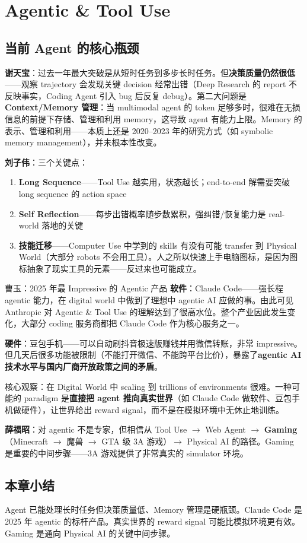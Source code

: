 \section{Agentic \& Tool Use}

\subsection{当前 Agent 的核心瓶颈}

\textbf{谢天宝}：过去一年最大突破是从短时任务到多步长时任务。但\textbf{决策质量仍然很低}——观察 trajectory 会发现关键 decision 经常出错（Deep Research 的 report 不反映事实，Coding Agent 引入 bug 后反复 debug）。第二大问题是 \textbf{Context/Memory 管理}：当 multimodal agent 的 token 足够多时，很难在无损信息的前提下存储、管理和利用 memory，这导致 agent 有能力上限。Memory 的表示、管理和利用——本质上还是 2020--2023 年的研究方式（如 symbolic memory management），并未根本性改变。

\textbf{刘子伟}：三个关键点：
\begin{enumerate}
  \item \textbf{Long Sequence}——Tool Use 越实用，状态越长；end-to-end 解需要突破 long sequence 的 action space
  \item \textbf{Self Reflection}——每步出错概率随步数累积，强纠错/恢复能力是 real-world 落地的关键
  \item \textbf{技能迁移}——Computer Use 中学到的 skills 有没有可能 transfer 到 Physical World（大部分 robots 不会用工具）。人之所以快速上手电脑图标，是因为图标抽象了现实工具的元素——反过来也可能成立。
\end{enumerate}

\begin{importantbox}{曹玉：2025 年最 Impressive 的 Agentic 产品}
\textbf{软件}：Claude Code——强长程 agentic 能力，在 digital world 中做到了理想中 agentic AI 应做的事。由此可见 Anthropic 对 Agentic \& Tool Use 的理解达到了很高水位。整个产业因此发生变化，大部分 coding 服务商都把 Claude Code 作为核心服务之一。

\textbf{硬件}：豆包手机——可以自动刷抖音极速版赚钱并用微信转账，非常 impressive。但几天后很多功能被限制（不能打开微信、不能跨平台比价），暴露了\textbf{agentic AI 技术水平与国内厂商开放政策之间的矛盾}。

核心观察：在 Digital World 中 scaling 到 trillions of environments 很难。一种可能的 paradigm 是\textbf{直接把 agent 推向真实世界}（如 Claude Code 做软件、豆包手机做硬件），让世界给出 reward signal，而不是在模拟环境中无休止地训练。
\end{importantbox}

\textbf{薛福昭}：对 agentic 不是专家，但相信从 Tool Use $\to$ Web Agent $\to$ \textbf{Gaming}（Minecraft $\to$ 魔兽 $\to$ GTA 级 3A 游戏）$\to$ Physical AI 的路径。Gaming 是重要的中间步骤——3A 游戏提供了非常真实的 simulator 环境。

\subsection{本章小结}
Agent 已能处理长时任务但决策质量低、Memory 管理是硬瓶颈。Claude Code 是 2025 年 agentic 的标杆产品。真实世界的 reward signal 可能比模拟环境更有效。Gaming 是通向 Physical AI 的关键中间步骤。

